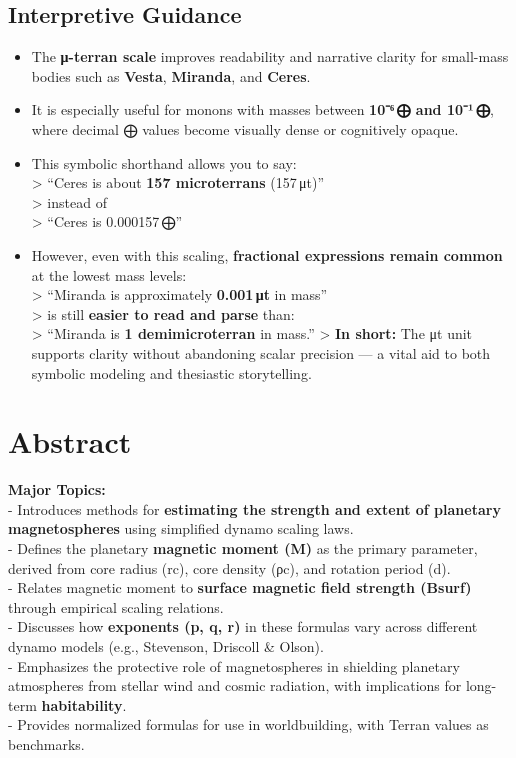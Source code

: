 \documentclass[
  letterpaper,
]{book}
\providecommand{\tightlist}{%
  \setlength{\itemsep}{0pt}\setlength{\parskip}{0pt}}
\begin{document}
\subsection{Interpretive Guidance}\label{interpretive-guidance}

\begin{itemize}
\tightlist
\item
  The \textbf{μ-terran scale} improves readability and narrative clarity
  for small-mass bodies such as \textbf{Vesta}, \textbf{Miranda}, and
  \textbf{Ceres}.\\
\item
  It is especially useful for monons with masses between \textbf{10⁻⁶\,⨁
  and 10⁻¹\,⨁}, where decimal ⨁ values become visually dense or
  cognitively opaque.\\
\item
  This symbolic shorthand allows you to say:\\
  \textgreater{} ``Ceres is about \textbf{157 microterrans}
  (157\,μt)''\\
  \textgreater{} instead of\\
  \textgreater{} ``Ceres is 0.000157\,⨁''\\
\item
  However, even with this scaling, \textbf{fractional expressions remain
  common} at the lowest mass levels:\\
  \textgreater{} ``Miranda is approximately \textbf{0.001\,μt} in
  mass''\\
  \textgreater{} is still \textbf{easier to read and parse} than:\\
  \textgreater{} ``Miranda is \textbf{1 demimicroterran} in mass.''
  \textgreater{} \textbf{In short:} The μt unit supports clarity without
  abandoning scalar precision --- a vital aid to both symbolic modeling
  and thesiastic storytelling.
\end{itemize}

\section{Abstract}\label{abstract-41}

\textbf{Major Topics:}\\
- Introduces methods for \textbf{estimating the strength and extent of
planetary magnetospheres} using simplified dynamo scaling laws.\\
- Defines the planetary \textbf{magnetic moment (M)} as the primary
parameter, derived from core radius (rc), core density (ρc), and
rotation period (d).\\
- Relates magnetic moment to \textbf{surface magnetic field strength
(Bsurf)} through empirical scaling relations.\\
- Discusses how \textbf{exponents (p, q, r)} in these formulas vary
across different dynamo models (e.g., Stevenson, Driscoll \& Olson).\\
- Emphasizes the protective role of magnetospheres in shielding
planetary atmospheres from stellar wind and cosmic radiation, with
implications for long-term \textbf{habitability}.\\
- Provides normalized formulas for use in worldbuilding, with Terran
values as benchmarks.
\end{document}
